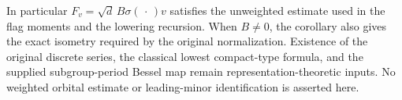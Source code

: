 In particular $F_v=\sqrt d\,B\sigma(\,\cdot\,)v$ satisfies the
unweighted estimate used in the flag moments and the lowering
recursion.  When $B\ne0$, the corollary also gives the exact
isometry required by the original normalization.  Existence
of the original discrete series, the classical lowest compact-type
formula, and the supplied subgroup-period Bessel map remain
representation-theoretic inputs.  No weighted orbital estimate or
leading-minor identification is asserted here.
